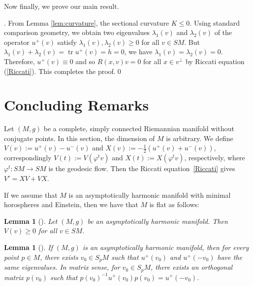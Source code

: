 \documentclass[12pt,a4paper]{amsart}
\newtheorem{Lem}[Thm]{Lemma}
\theoremstyle{definition}
\theoremstyle{remark}
\newcommand{\la}{\lambda}
\newcommand{\tr}{\operatorname{tr}}
\newcommand \<{\langle}
\renewcommand \>{\rangle}
\begin{document}
Now finally, we  prove our main result.

\medskip
{}. From Lemma \ref{lem:curvature}, the sectional curvature $K\le 0$. Using standard comparison geometry, we obtain two eigenvalues $\la_1 (v)$ and $\la_2 (v)$ of the operator $u^{+}(v)$ satisfy $\la_1(v), \la_2 (v)\ge 0$ for all $v\in SM$. But $\la_1(v)+\la_2 (v)=\tr u^{+}(v) = h = 0$, we have $\la_1(v)=\la_2 (v)=0$. Therefore, $u^{+}(v)\equiv 0$  and so $R(x,v)v = 0$ for all $x\in v^\perp$ by  Riccati equation  (\ref{Riccati}).
This completes the proof.\hfill \qed

\section{Concluding Remarks}
Let $(M,g)$ be a complete, simply connected Riemannian
manifold without conjugate points. In this section, the dimension of $M$ is arbitrary.
We define $V(v):=u^{+}(v)-u^{-}(v)$ and $X(v):=-\frac{1}{2}(u^{+}(v)+u^{-}(v))$, correspondingly $V(t):=V(\varphi^t v)$ and $X(t):=X(\varphi^t v)$, respectively, where $\varphi^t :SM \to SM$ is the geodesic flow. Then the Riccati equation~\eqref{Riccati} gives  $V' = XV+VX$.

If we assume that $M$ is an asymptotically harmonic manifold with minimal horospheres and Einstein, then we have that $M$ is flat as follows:

\begin{Lem}[\cite{Z}]\label{lem:nonnegativeV}
    Let $(M,g)$ be an asymptotically harmonic manifold. Then $V(v)\ge 0$ for all $v \in SM$.
\end{Lem}

\begin{Lem}[\cite{S1}]\label{lem:u+}
    If $(M,g)$ is an asymptotically harmonic manifold, then for every point $p\in M$, there exists $v_0 \in S_p M$ such that $u^{+}(v_0)$ and $u^{+}(-v_0)$ have the same eigenvalues. In matrix sense, for $v_0 \in S_p M$, there exists an orthogonal matrix $p(v_0 )$ such that $p(v_0)^{-1}u^{+}(v_0)p(v_0)=u^{+}(-v_0)$.
\end{Lem}
\end{document}
